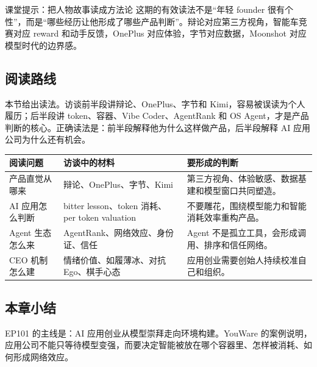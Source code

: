 \begin{knowledgebox}{课堂提示：把人物故事读成方法论}
这期的有效读法不是“年轻 founder 很有个性”，而是“哪些经历让他形成了哪些产品判断”。辩论对应第三方视角，智能车竞赛对应 reward 和动手反馈，OnePlus 对应体验，字节对应数据，Moonshot 对应模型时代的边界感。
\end{knowledgebox}

\subsection{阅读路线}

本节给出读法。访谈前半段讲辩论、OnePlus、字节和 Kimi，容易被误读为个人履历；后半段讲 token、容器、Vibe Coder、AgentRank 和 OS Agent，才是产品判断的核心。正确读法是：前半段解释他为什么这样做产品，后半段解释 AI 应用公司为什么还有机会。

\noindent\begin{tabularx}{\textwidth}{p{}p{}X}
\toprule
阅读问题 & 访谈中的材料 & 要形成的判断 \\
\midrule
产品直觉从哪来 & 辩论、OnePlus、字节、Kimi & 第三方视角、体验敏感、数据基建和模型窗口共同塑造。 \\
AI 应用怎么判断 & bitter lesson、token 消耗、per token valuation & 不要雕花，围绕模型能力和智能消耗效率重构产品。 \\
Agent 生态怎么来 & AgentRank、网络效应、身份证、信任 & Agent 不是孤立工具，会形成调用、排序和信任网络。 \\
CEO 机制怎么建 & 情绪价值、如履薄冰、对抗 Ego、棋手心态 & 应用创业需要创始人持续校准自己和组织。 \\
\bottomrule
\end{tabularx}

\subsection{本章小结}

EP101 的主线是：AI 应用创业从模型崇拜走向环境构建。YouWare 的案例说明，应用公司不能只等待模型变强，而要决定智能被放在哪个容器里、怎样被消耗、如何形成网络效应。

